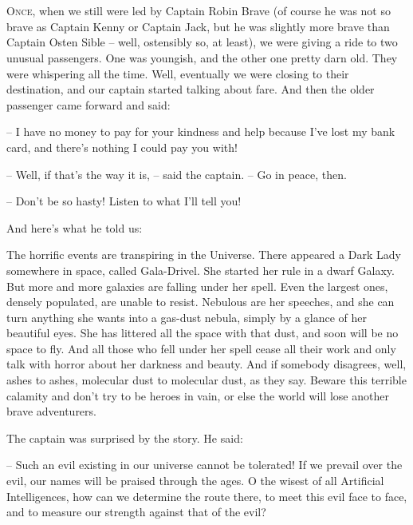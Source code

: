 \documentclass[ebook,twoside,final,openright]{memoir}
\begin{document}
\chapter{}
\par
\lettrine{O}{nce,} when we still were led by Captain Robin Brave (of course he was not so brave as Captain Kenny or Captain Jack, but he was slightly more brave than Captain Osten Sible – well, ostensibly so, at least), we were giving a ride to two unusual passengers. One was youngish, and the other one pretty darn old. They were whispering all the time. Well, eventually we were closing to their destination, and our captain started talking about fare. And then the older passenger came forward and said: \par
\par
– I have no money to pay for your kindness and help because I’ve lost my bank card, and there’s nothing I could pay you with!\par
– Well, if that’s the way it is, – said the captain. – Go in peace, then. \par
– Don’t be so hasty! Listen to what I’ll tell you! \par
 And here’s what he told us:\par
\par
The horrific events are transpiring in the Universe. There appeared a Dark Lady somewhere in space, called Gala-Drivel. She started her rule in a dwarf Galaxy. But more and more galaxies are falling under her spell. Even the largest ones, densely populated, are unable to resist. Nebulous are her speeches, and she can turn anything she wants into a gas-dust nebula, simply by a glance of her beautiful eyes. She has littered all the space with that dust, and soon will be no space to fly. And all those who fell under her spell cease all their work and only talk with horror about her darkness and beauty. And if somebody disagrees, well, ashes to ashes, molecular dust to molecular dust, as they say. Beware this terrible calamity and don’t try to be heroes in vain, or else the world will lose another brave adventurers.\par
\par
The captain was surprised by the story. He said:\par
– Such an evil existing in our universe cannot be tolerated! If we prevail over the evil, our names will be praised through the ages. O the wisest of all Artificial Intelligences, how can we determine the route there, to meet this evil face to face, and to measure our strength against that of the evil?\par
\end{document}
